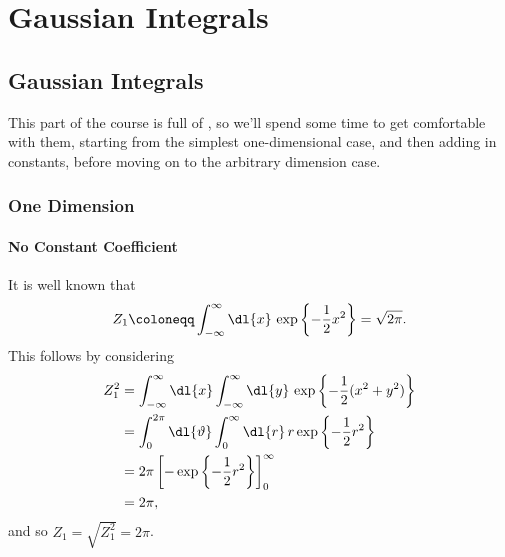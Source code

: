 \documentclass[fleqn]{NotesClass}
\newcommand{\interaction}{\symrm{I}}
\begin{document}
    
    
    
    
    
    
    
    
    
    
    
    
    
    
    
    
    
    
    
    
    
    
    
    
    
    
    
    
    
    
    
    
    \renewcommand{\interaction}{\text{int}}
    
    \part{Gaussian Integrals}
    \chapter{Gaussian Integrals}
    This part of the course is full of , so we'll spend some time to get comfortable with them, starting from the simplest one-dimensional case, and then adding in constants, before moving on to the arbitrary dimension case.
    \section{One Dimension}
    \subsection{No Constant Coefficient}
    It is well known that
    \begin{equation}
        Z_{1} \coloneqq \int_{-\infty}^{\infty} \dl{x} \, \exp\left\{ -\frac{1}{2}x^2 \right\} = \sqrt{2\pi}.
    \end{equation}
    This follows by considering
    \begin{align}
        Z_{1}^2 &= \int_{-\infty}^{\infty} \dl{x} \int_{-\infty}^{\infty} \dl{y} \, \exp\left\{ -\frac{1}{2}(x^2 + y^2) \right\}\\
        &= \int_{0}^{2\pi} \dl{\vartheta} \int_{0}^{\infty} \dl{r} \, r \exp\left\{ -\frac{1}{2}r^2 \right\}\\
        &= 2\pi \left[ -\exp\left\{ -\frac{1}{2}r^2 \right\} \right]_{0}^{\infty}\\
        &= 2\pi,
    \end{align}
    and so \(Z_1 = \sqrt{Z_1^2} = 2\pi\).
    
\end{document}
